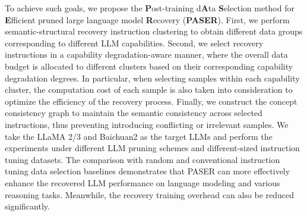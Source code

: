 To achieve such goals, we propose the \textbf{P}ost-training d\textbf{A}ta \textbf{S}election method for \textbf{E}fficient pruned large language model \textbf{R}ecovery (\textbf{PASER}). First, we perform semantic-structural recovery instruction clustering to obtain different data groups corresponding to different LLM capabilities. Second, we select recovery instructions in a capability degradation-aware manner, where the overall data budget is allocated to different clusters based on their corresponding capability degradation degrees. %
In particular, when selecting samples within each capability cluster, the computation cost of each sample is also taken into consideration to optimize the efficiency of the recovery process. Finally, we construct the concept consistency graph to maintain the semantic consistency across selected instructions, thus preventing introducing conflicting or irrelevant samples. We take the LLaMA 2/3 and Baichuan2 as the target LLMs and perform the experiments under different LLM pruning schemes and different-sized instruction tuning datasets. The comparison with random and conventional instruction tuning data selection baselines demonstrates that PASER can more effectively enhance the recovered LLM performance on language modeling and various reasoning tasks. Meanwhile, the recovery training overhead can also be reduced significantly.

